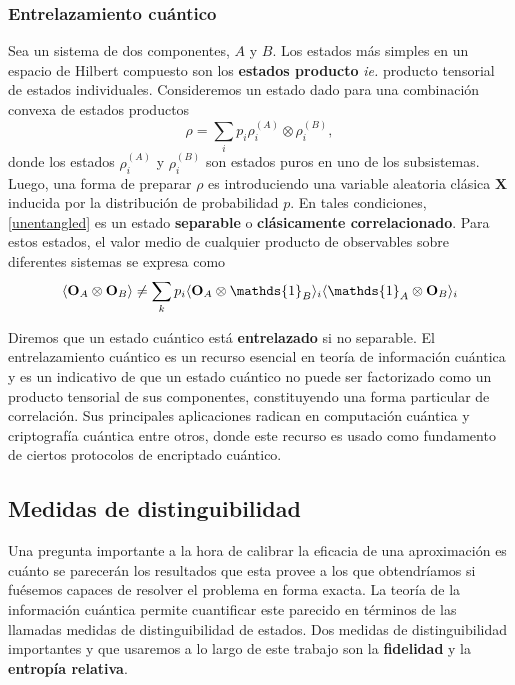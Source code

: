 \documentclass{report} %
\newcommand{\lgg}{\langle}
\newcommand{\rgg}{\rangle}
\newcommand{\ie}{\textit{ie. }}
\numberwithin{equation}{section}
\begin{document}
 \subsubsection{Entrelazamiento cuántico}
 
Sea un sistema de dos componentes, $A$ y $B$. Los estados más simples en un espacio de Hilbert compuesto son los \textbf{estados producto} \ie producto tensorial de estados individuales. Consideremos un estado dado para una combinación convexa de estados productos
\begin{equation}
    \rho = \sum_{i} p_i \rho^{(A)}_i \otimes \rho^{(B)}_i, 
    \label{unentangled}
\end{equation}
donde los estados $\rho^{(A)}_i$ y $\rho^{(B)}_i $ son estados puros en uno de los subsistemas. Luego, una forma de preparar $\rho$ es introduciendo una variable aleatoria clásica $\mathbf{X}$ inducida por la distribución de probabilidad $p$. En tales condiciones, \eqref{unentangled} es un estado \textbf{separable} o \textbf{clásicamente correlacionado}. Para estos estados, el valor medio de cualquier producto de observables sobre diferentes sistemas se expresa como
$$\lgg {\bf O}_A \otimes {\bf O}_B \rgg \neq \sum_k p_i \lgg {\bf O}_A \otimes \mathds{1}_{B} \rgg _{i}\lgg \mathds{1}_{A} \otimes {\bf O}_B \rgg_i$$


Diremos que un estado cuántico está \textbf{entrelazado} si no separable. %
El entrelazamiento cuántico es un recurso esencial en teoría de información cuántica
y es un indicativo de que un estado cuántico no puede ser factorizado como un producto tensorial de sus componentes, constituyendo una forma particular de correlación. 
Sus principales aplicaciones radican en computación cuántica \cite{QCJozsa_2003} y criptografía cuántica 
\cite{QCrypto_Ekert, QCrypto_2} entre otros, donde este recurso es usado como fundamento de ciertos protocolos de encriptado cuántico.

\clearpage
 
 \subsection{Medidas de distinguibilidad}

Una pregunta importante a la hora de calibrar la eficacia de una aproximación es cuánto se parecerán los resultados que esta provee a los que obtendríamos si fuésemos capaces de resolver el problema en forma exacta. La teoría de la información cuántica permite cuantificar este parecido en términos de las llamadas medidas de distinguibilidad de estados. Dos medidas de distinguibilidad importantes y que usaremos a lo largo de este trabajo son la \textbf{fidelidad} \cite{Nielsen.00} y la \textbf{entropía relativa}. \\
\end{document}
